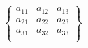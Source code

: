 \begin{equation}
   \begin{Bmatrix} 
   a_{11} & a_{12} & a_{13}  \\
   a_{21} & a_{22} & a_{23}  \\
   a_{31} & a_{32} & a_{33}  \\
   \end{Bmatrix} 
\end{equation}